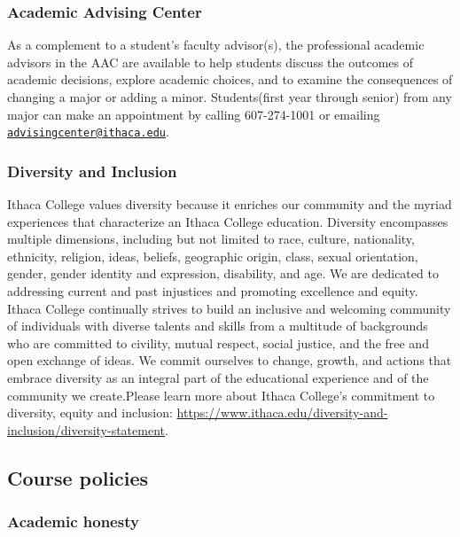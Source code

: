 \documentclass[
  letterpaper,
  DIV=11,
  numbers=noendperiod]{scrartcl}
\begin{document}
\subsubsection{Academic Advising Center}\label{academic-advising-center}

As a complement to a student's faculty advisor(s), the professional
academic advisors in the AAC are available to help students discuss the
outcomes of academic decisions, explore academic choices, and to examine
the consequences of changing a major or adding a minor. Students(first
year through senior) from any major can make an appointment by calling
607-274-1001 or emailing
\href{mailto:advisingcenter@ithaca.edu}{\nolinkurl{advisingcenter@ithaca.edu}}.

\subsubsection{Diversity and Inclusion}\label{diversity-and-inclusion}

Ithaca College values diversity because it enriches our community and
the myriad experiences that characterize an Ithaca College education.
Diversity encompasses multiple dimensions, including but not limited to
race, culture, nationality, ethnicity, religion, ideas, beliefs,
geographic origin, class, sexual orientation, gender, gender identity
and expression, disability, and age. We are dedicated to addressing
current and past injustices and promoting excellence and equity. Ithaca
College continually strives to build an inclusive and welcoming
community of individuals with diverse talents and skills from a
multitude of backgrounds who are committed to civility, mutual respect,
social justice, and the free and open exchange of ideas. We commit
ourselves to change, growth, and actions that embrace diversity as an
integral part of the educational experience and of the community we
create.Please learn more about Ithaca College's commitment to diversity,
equity and inclusion:
\url{https://www.ithaca.edu/diversity-and-inclusion/diversity-statement}.

\subsection{Course policies}\label{course-policies}

\subsubsection{Academic honesty}\label{academic-honesty}
\end{document}
